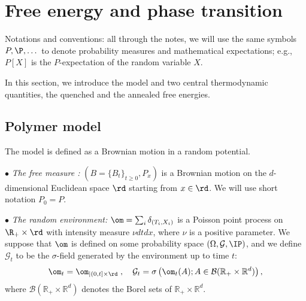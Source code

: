 \newcommand{\gibbs}{P_t^{\b,\om}}
\newcommand{\gibbss}{P_s^{\b,\om}}
\newcommand{\gibbsDeux}{P_t^{\b,\om,\otimes 2}}

\newcommand{\gibbsni}{P_{n-i}^{\b,\theta_{i,x}\om}}
\newcommand{\gibbsmn}{P_{m+n}^{\b,\om}}
\newcommand{\gibbsmdn}{P_{m}^{\b,\theta_{n,y}\om}}
\newcommand{\gibbsdn}{P_{2n}^{\b,\om}}
\newcommand{\gibbsbu}{P_n^{\b_1,\om}}
\newcommand{\gibbsbd}{P_n^{\b_2,\om}}
\newcommand{\gibbsbp}{P_n^{\b',\om}}
\newcommand{\gibbsdnpu}{P_{2n+1}^{\b,\om}}
\newcommand{\gibbsmu}{P_{t-1}^{\b,\om}}
\newcommand{\gibbsc}{P_{t}^{\b,\om,2}}
\newcommand{\gibbsmuc}{P_{t-1}^{\b,\om, 2}}
\newcommand{\gibbspc}{[P_{t}^{\b,\om}]^{\otimes 2}}
\newcommand{\gibbsmupc}{[P_{t-1}^{\b,\om}]^{\otimes 2}}
\newcommand{\gibbsp}{P_n^{\b',\om}}





 \chapter{Free energy and phase transition} \label{sec:thermo}
 
 

 
 
 
 Notations and conventions: all through the notes, we will use the same symbols $P, \P, \dots$ to denote probability measures and mathematical expectations; e.g., $P[X]$ is the 
 $P$-expectation of the random variable $X$.  
\medskip

In this section, we introduce the model and two central thermodynamic quantities, the quenched and the annealed free energies.


\section{Polymer model}

The model is defined as a Brownian motion in a random potential. 
\medskip


$\bullet$ {\it The free measure :}   
$(B=\{ B_t\}_{t \geq 0}, P_x)$ is a Brownian motion on 
the $d$-dimensional Euclidean space $\rd$ starting from $x \in \rd$.
We will use short notation  $P_0=P$.

$\bullet$ {\it The random environment:}  
$\om = \sum_i \delta_{(T_i,X_i)}$ is a Poisson point process on $\R_+ \times \rd$ with intensity measure $\nu dt dx$, where $\nu$ is a positive parameter. We suppose that $\om$ is defined on some probability space $(\Omega,\mathcal{G},\IP)$, and we define $\mathcal{G}_t$ to be the $\sigma$-field generated by the environment up to time $t$:
\begin{equation}
\om_t=\om_{|(0,t]\times \rd} \;,\quad \mathcal{G}_t = \sigma\left(\om_t(A) ; A \in \mathcal{B}(\mathbb{R}_+ \times \mathbb{R}^d) \right),
\end{equation}
where $\mathcal{B}(\mathbb{R}_+ \times \mathbb{R}^d)$ denotes the Borel sets of $\mathbb{R}_+ \times \mathbb{R}^d$.
\medskip


